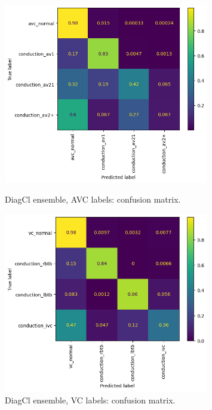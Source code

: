 \documentclass[a4paper,10pt]{article}
\begin{document}
\begin{figure}[p]
	\begin{minipage}{\textwidth}
		\centering
		\includegraphics[width=0.8\textwidth]{diagcl_avc_cm.png}
		\caption{DiagCl ensemble, AVC labels: confusion matrix.}
		\label{fig:diagcl_avc_cm}
	\end{minipage}
	\baselineskip
	\begin{minipage}{\textwidth}
		\centering
		\includegraphics[width=0.8\textwidth]{diagcl_vc_cm.png}
		\caption{DiagCl ensemble, VC labels: confusion matrix.}
		\label{fig:diagcl_vc_cm}
	\end{minipage}
\end{figure}
\end{document}
